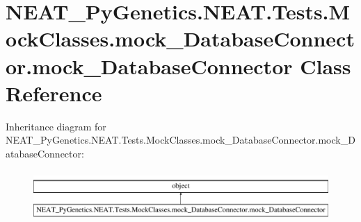 \hypertarget{classNEAT__PyGenetics_1_1NEAT_1_1Tests_1_1MockClasses_1_1mock__DatabaseConnector_1_1mock__DatabaseConnector}{}\section{N\+E\+A\+T\+\_\+\+Py\+Genetics.\+N\+E\+A\+T.\+Tests.\+Mock\+Classes.\+mock\+\_\+\+Database\+Connector.\+mock\+\_\+\+Database\+Connector Class Reference}
\label{classNEAT__PyGenetics_1_1NEAT_1_1Tests_1_1MockClasses_1_1mock__DatabaseConnector_1_1mock__DatabaseConnector}
Inheritance diagram for N\+E\+A\+T\+\_\+\+Py\+Genetics.\+N\+E\+A\+T.\+Tests.\+Mock\+Classes.\+mock\+\_\+\+Database\+Connector.\+mock\+\_\+\+Database\+Connector\+:\begin{figure}[H]
\begin{center}
\leavevmode
\includegraphics[height=1.941074cm]{classNEAT__PyGenetics_1_1NEAT_1_1Tests_1_1MockClasses_1_1mock__DatabaseConnector_1_1mock__DatabaseConnector}
\end{center}
\end{figure}
